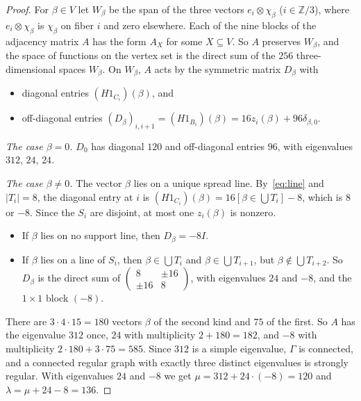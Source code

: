 \documentclass[11pt]{amsart}
\theoremstyle{definition}
\begin{document}
\begin{proof}
For $\beta\in V$ let $W_\beta$ be the span of the three vectors $e_i\otimes\chi_\beta$ ($i\in\mathbb Z/3$), where $e_i\otimes\chi_\beta$ is $\chi_\beta$ on fiber $i$ and zero elsewhere. Each of the nine blocks of the adjacency matrix $A$ has the form $A_X$ for some $X\subseteq V$. So $A$ preserves $W_\beta$, and the space of functions on the vertex set is the direct sum of the $256$ three-dimensional spaces $W_\beta$. On $W_\beta$, $A$ acts by the symmetric matrix $D_\beta$ with
\begin{itemize}
\item diagonal entries $(H1_{C_i})(\beta)$, and
\item off-diagonal entries $(D_\beta)_{i,i+1}=(H1_{B_i})(\beta)=16z_i(\beta)+96\delta_{\beta,0}$.
\end{itemize}

\emph{The case $\beta=0$.} $D_0$ has diagonal $120$ and off-diagonal entries $96$, with eigenvalues $312$, $24$, $24$.

\emph{The case $\beta\ne0$.} The vector $\beta$ lies on a unique spread line. By~\eqref{eq:line} and $|T_i|=8$, the diagonal entry at $i$ is $(H1_{C_i})(\beta)=16[\beta\in\bigcup T_i]-8$, which is $8$ or $-8$. Since the $S_i$ are disjoint, at most one $z_i(\beta)$ is nonzero.
\begin{itemize}
\item If $\beta$ lies on no support line, then $D_\beta=-8I$.
\item If $\beta$ lies on a line of $S_i$, then $\beta\in\bigcup T_i$ and $\beta\in\bigcup T_{i+1}$, but $\beta\notin\bigcup T_{i+2}$. So $D_\beta$ is the direct sum of $\begin{pmatrix}8&\pm16\\\pm16&8\end{pmatrix}$, with eigenvalues $24$ and $-8$, and the $1\times1$ block $(-8)$.
\end{itemize}

There are $3\cdot4\cdot15=180$ vectors $\beta$ of the second kind and $75$ of the first. So $A$ has the eigenvalue $312$ once, $24$ with multiplicity $2+180=182$, and $-8$ with multiplicity $2\cdot180+3\cdot75=585$. Since $312$ is a simple eigenvalue, $\Gamma$ is connected, and a connected regular graph with exactly three distinct eigenvalues is strongly regular. With eigenvalues $24$ and $-8$ we get $\mu=312+24\cdot(-8)=120$ and $\lambda=\mu+24-8=136$.
\end{proof}

\end{document}
